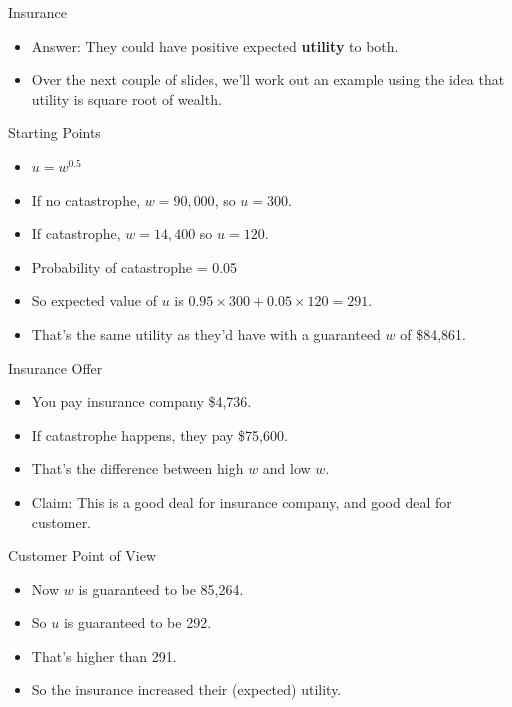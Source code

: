 \documentclass[
  ignorenonframetext,
]{beamer}
\providecommand{\tightlist}{%
  \setlength{\itemsep}{0pt}\setlength{\parskip}{0pt}}
\renewcommand{\,}{\text{, }}
\begin{document}
\begin{frame}{Insurance}
\protect\hypertarget{insurance-1}{}

\begin{itemize}
\tightlist
\item
  Answer: They could have positive expected \textbf{utility} to both.
\item
  Over the next couple of slides, we'll work out an example using the
  idea that utility is square root of wealth.
\end{itemize}

\end{frame}

\begin{frame}{Starting Points}
\protect\hypertarget{starting-points}{}

\begin{itemize}
\tightlist
\item
  \(u = w^{0.5}\)
\item
  If no catastrophe, \(w = 90,000\), so \(u = 300\).
\item
  If catastrophe, \(w = 14,400\) so \(u = 120\).
\item
  Probability of catastrophe = 0.05
\item
  So expected value of \(u\) is
  \(0.95 \times 300 + 0.05 \times 120 = 291\).
\item
  That's the same utility as they'd have with a guaranteed \(w\) of
  \$84,861.
\end{itemize}

\end{frame}

\begin{frame}{Insurance Offer}
\protect\hypertarget{insurance-offer}{}

\begin{itemize}
\tightlist
\item
  You pay insurance company \$4,736.
\item
  If catastrophe happens, they pay \$75,600.
\item
  That's the difference between high \(w\) and low \(w\).
\item
  Claim: This is a good deal for insurance company, and good deal for
  customer.
\end{itemize}

\end{frame}

\begin{frame}{Customer Point of View}
\protect\hypertarget{customer-point-of-view}{}

\begin{itemize}
\tightlist
\item
  Now \(w\) is guaranteed to be 85,264.
\item
  So \(u\) is guaranteed to be 292.
\item
  That's higher than 291.
\item
  So the insurance increased their (expected) utility.
\end{itemize}

\end{frame}
\end{document}
